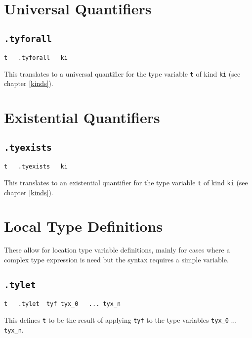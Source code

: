 \documentclass{report}
\newcommand\stringcode[1]{\texttt{#1}}
\begin{document}
\section{Universal Quantifiers}
\label{type_forall}

\subsection{\stringcode{.tyforall}}

\begin{verbatim}
t	.tyforall	ki
\end{verbatim}

This translates to a universal quantifier for the type variable \stringcode{t} of kind \stringcode{ki} (see chapter \ref{kinds}).

\section{Existential Quantifiers}
\label{type_exists}

\subsection{\stringcode{.tyexists}}

\begin{verbatim}
t	.tyexists	ki
\end{verbatim}

This translates to an existential quantifier for the type variable \stringcode{t} of kind \stringcode{ki} (see chapter \ref{kinds}).

\section{Local Type Definitions}
\label{type_let}

These allow for location type variable definitions,
mainly for cases where a complex type expression is need but the syntax requires a simple variable.

\subsection{\stringcode{.tylet}}

\begin{verbatim}
t	.tylet	tyf	tyx_0	...	tyx_n
\end{verbatim}

This defines \stringcode{t} to be the result of applying \stringcode{tyf} to the type variables \stringcode{tyx\_0} $\ldots$ \stringcode{tyx\_n}.
\end{document}
